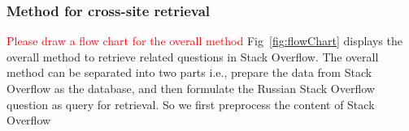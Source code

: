 \subsubsection{Method for cross-site retrieval}
\textcolor{red}{Please draw a flow chart for the overall method}
Fig~\ref{fig:flowChart} displays the overall method to retrieve related questions in Stack Overflow.
The overall method can be separated into two parts i.e., prepare the data from  Stack Overflow as the database, and then formulate the Russian Stack Overflow question as query for retrieval.
So we first preprocess the content of Stack Overflow

